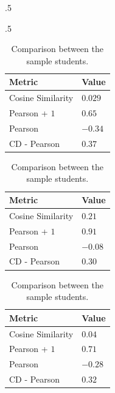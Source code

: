 \begin{table}[!htb]
\begin{subtable}{.5\linewidth}
            \caption{Comparison between $S_1$ and $S_4$.}
            
    \end{subtable}
    \begin{subtable}{.5\linewidth}
      \centering
      
            \begin{tabular}{ll}
            \hline
            Metric            & Value  \\
            \hline
            Cosine Similarity &  $0.029$ \\
            Pearson + $1$       &  $0.65$  \\
            Pearson           & $-0.34$  \\
            CD - Pearson      &  $0.37$  \\
            \hline
            \end{tabular}

            \caption{Comparison between $S_2$ and $S_3$.}
            
            \vspace{1em}

            \begin{tabular}{ll}
            \hline
            Metric            & Value  \\
            \hline
            Cosine Similarity &  $0.21$  \\
            Pearson + $1$       &  $0.91$  \\
            Pearson           & $-0.08$  \\
            CD - Pearson      &  $0.30$  \\
            \hline
            \end{tabular}

            \caption{Comparison between $S_2$ and $S_4$.}
            
            \vspace{1em}

            \begin{tabular}{ll}
            \hline
            Metric            & Value  \\
            \hline
            Cosine Similarity &  $0.04$  \\
            Pearson + $1$       &  $0.71$  \\
            Pearson           & $-0.28$  \\
            CD - Pearson      &  $0.32$  \\
            \hline
            \end{tabular}

            \caption{Comparison between $S_3$ and $S_4$.}
            
    \end{subtable} 
    \caption{Comparison between the sample students.}
    \label{table:results_interests_comp}
\end{table}


